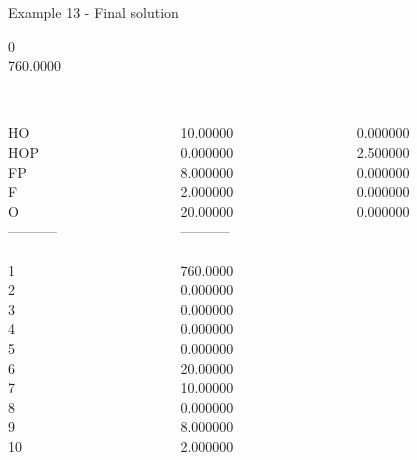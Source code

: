 \begin{frame}{Example 13 - Final solution}

  0\\
  760.0000\\

\begin{columns}[t]
\begin{column}{0.3\textwidth}
\\
HO\\
HOP\\
FP\\
F\\
O\\
-----------\\
\\
1\\
2\\
3\\
4\\
5\\
6\\
7\\
8\\
9\\
10\\

\end{column}
\begin{column}{0.3\textwidth}
\\
10.00000\\
0.000000\\
8.000000\\
2.000000\\
20.00000\\

-----------\\
\\
760.0000\\
0.000000\\
0.000000\\
0.000000\\
0.000000\\
20.00000\\
10.00000\\
0.000000\\
8.000000\\
2.000000\\
\end{column}  

\begin{column}{0.3\textwidth}
\\
0.000000\\
2.500000\\
0.000000\\
0.000000\\
0.000000\\


\end{column}
\end{columns}
\end{frame}
